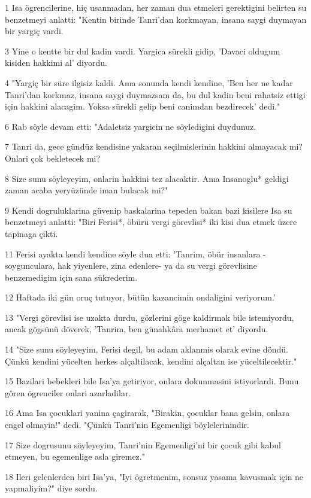\par 1 Isa ögrencilerine, hiç usanmadan, her zaman dua etmeleri gerektigini belirten su benzetmeyi anlatti: "Kentin birinde Tanri'dan korkmayan, insana saygi duymayan bir yargiç vardi.
\par 3 Yine o kentte bir dul kadin vardi. Yargica sürekli gidip, 'Davaci oldugum kisiden hakkimi al' diyordu.
\par 4 "Yargiç bir süre ilgisiz kaldi. Ama sonunda kendi kendine, 'Ben her ne kadar Tanri'dan korkmaz, insana saygi duymazsam da, bu dul kadin beni rahatsiz ettigi için hakkini alacagim. Yoksa sürekli gelip beni canimdan bezdirecek' dedi."
\par 6 Rab söyle devam etti: "Adaletsiz yargicin ne söyledigini duydunuz.
\par 7 Tanri da, gece gündüz kendisine yakaran seçilmislerinin hakkini almayacak mi? Onlari çok bekletecek mi?
\par 8 Size sunu söyleyeyim, onlarin hakkini tez alacaktir. Ama Insanoglu* geldigi zaman acaba yeryüzünde iman bulacak mi?"
\par 9 Kendi dogruluklarina güvenip baskalarina tepeden bakan bazi kisilere Isa su benzetmeyi anlatti: "Biri Ferisi*, öbürü vergi görevlisi* iki kisi dua etmek üzere tapinaga çikti.
\par 11 Ferisi ayakta kendi kendine söyle dua etti: 'Tanrim, öbür insanlara -soygunculara, hak yiyenlere, zina edenlere- ya da su vergi görevlisine benzemedigim için sana sükrederim.
\par 12 Haftada iki gün oruç tutuyor, bütün kazancimin ondaligini veriyorum.'
\par 13 "Vergi görevlisi ise uzakta durdu, gözlerini göge kaldirmak bile istemiyordu, ancak gögsünü döverek, 'Tanrim, ben günahkâra merhamet et' diyordu.
\par 14 "Size sunu söyleyeyim, Ferisi degil, bu adam aklanmis olarak evine döndü. Çünkü kendini yücelten herkes alçaltilacak, kendini alçaltan ise yüceltilecektir."
\par 15 Bazilari bebekleri bile Isa'ya getiriyor, onlara dokunmasini istiyorlardi. Bunu gören ögrenciler onlari azarladilar.
\par 16 Ama Isa çocuklari yanina çagirarak, "Birakin, çocuklar bana gelsin, onlara engel olmayin!" dedi. "Çünkü Tanri'nin Egemenligi böylelerinindir.
\par 17 Size dogrusunu söyleyeyim, Tanri'nin Egemenligi'ni bir çocuk gibi kabul etmeyen, bu egemenlige asla giremez."
\par 18 Ileri gelenlerden biri Isa'ya, "Iyi ögretmenim, sonsuz yasama kavusmak için ne yapmaliyim?" diye sordu.

